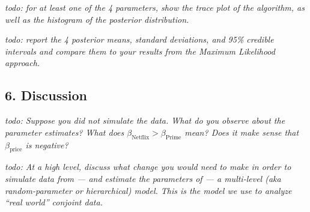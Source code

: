 \documentclass[
  letterpaper,
  DIV=11,
  numbers=noendperiod]{scrartcl}
\begin{document}
\emph{todo: for at least one of the 4 parameters, show the trace plot of
the algorithm, as well as the histogram of the posterior distribution.}

\emph{todo: report the 4 posterior means, standard deviations, and 95\%
credible intervals and compare them to your results from the Maximum
Likelihood approach.}

\subsection{6. Discussion}\label{discussion}

\emph{todo: Suppose you did not simulate the data. What do you observe
about the parameter estimates? What does
\(\beta_\text{Netflix} > \beta_\text{Prime}\) mean? Does it make sense
that \(\beta_\text{price}\) is negative?}

\emph{todo: At a high level, discuss what change you would need to make
in order to simulate data from --- and estimate the parameters of --- a
multi-level (aka random-parameter or hierarchical) model. This is the
model we use to analyze ``real world'' conjoint data.}
\end{document}
